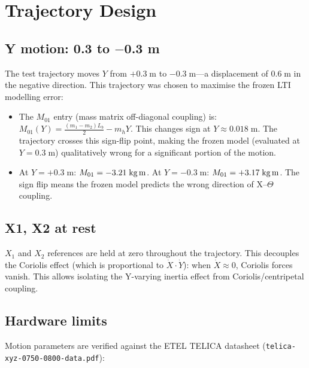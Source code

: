 \documentclass[11pt,a4paper]{article}
\begin{document}
\section{Trajectory Design}
\label{sec:trajectory}

\subsection{Y motion: 0.3 to $-$0.3 m}

The test trajectory moves $Y$ from $+0.3\;\text{m}$ to $-0.3\;\text{m}$---a displacement of
$0.6\;\text{m}$ in the negative direction. This trajectory was chosen to maximise the frozen
LTI modelling error:

\begin{itemize}[nosep]
\item The $M_{01}$ entry (mass matrix off-diagonal coupling) is:
  $M_{01}(Y) = \frac{(m_1 - m_2) L_b}{2} - m_h Y$.
  This changes sign at $Y \approx 0.018\;\text{m}$. The trajectory crosses this sign-flip
  point, making the frozen model (evaluated at $Y = 0.3\;\text{m}$) qualitatively wrong for
  a significant portion of the motion.
\item At $Y = +0.3\;\text{m}$: $M_{01} = -3.21\;\text{kg\,m}$.
  At $Y = -0.3\;\text{m}$: $M_{01} = +3.17\;\text{kg\,m}$.
  The sign flip means the frozen model predicts the wrong direction of X--$\Theta$ coupling.
\end{itemize}

\subsection{X1, X2 at rest}

$X_1$ and $X_2$ references are held at zero throughout the trajectory. This decouples the
Coriolis effect (which is proportional to $\dot{X} \cdot \dot{Y}$): when $\dot{X} \approx 0$,
Coriolis forces vanish. This allows isolating the Y-varying inertia effect from
Coriolis/centripetal coupling.

\subsection{Hardware limits}

Motion parameters are verified against the ETEL TELICA datasheet
(\texttt{telica-xyz-0750-0800-data.pdf}):
\end{document}
